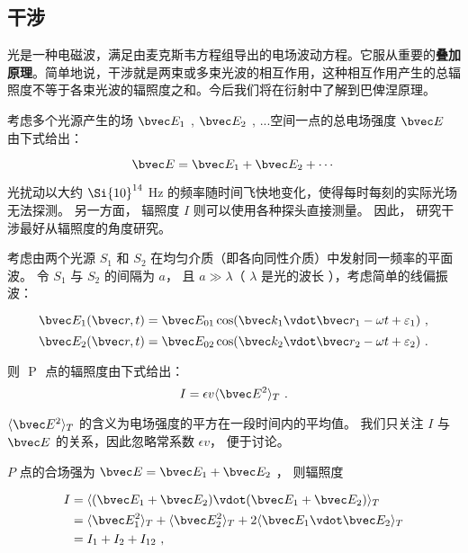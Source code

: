 
\subsection{干涉}

光是一种电磁波，满足由麦克斯韦方程组导出的电场波动方程。它服从重要的\textbf{叠加原理}。简单地说，干涉就是两束或多束光波的相互作用，这种相互作用产生的总辐照度不等于各束光波的辐照度之和。今后我们将在衍射中了解到巴俾涅原理。

考虑多个光源产生的场 $\bvec E_1$ , $\bvec E_2$ , ...空间一点的总电场强度 $\bvec E$ 由下式给出：

\begin{equation}
\bvec E = \bvec E_1 + \bvec E_2 + \cdots
\end{equation}

光扰动以大约 $\Si{10}^{14}$ Hz 的频率随时间飞快地变化，使得每时每刻的实际光场无法探测。 另一方面， 辐照度 $I$ 则可以使用各种探头直接测量。 因此， 研究干涉最好从辐照度的角度研究。

考虑由两个光源 $S_1$ 和 $S_2$ 在均匀介质（即各向同性介质）中发射同一频率的平面波。 令 $S_1$ 与 $S_2$ 的间隔为 $a$， 且 $ a \gg \lambda $（ $\lambda$ 是光的波长 ），考虑简单的线偏振波：

$$ \bvec E_1 ( \bvec r , t) = \bvec E_{01} \cos (\bvec k_1 \vdot \bvec r_1 - \omega t + \varepsilon_1 )~,$$
$$ \bvec E_2 ( \bvec r , t) = \bvec E_{02} \cos (\bvec k_2 \vdot \bvec r_2 - \omega t + \varepsilon_2 )~.$$

则 $ $ P $ $ 点的辐照度由下式给出：
\begin{equation}
 I = \epsilon v \langle \bvec E^2 \rangle _T ~.
\end{equation}

$\langle \bvec E^2 \rangle _T$ 的含义为电场强度的平方在一段时间内的平均值。 我们只关注 $ I $ 与 $ \bvec E $ 的关系，因此忽略常系数 $ \epsilon v$， 便于讨论。 

 $ P $ 点的合场强为 $ \bvec E = \bvec E_1 + \bvec E_2 $ ， 则辐照度

\begin{equation}   
\begin{aligned}
I &= \langle( \bvec E_1 + \bvec E_2)\vdot( \bvec E_1 + \bvec E_2 )\rangle _T \\
&= \langle \bvec E_1^2 \rangle _T + \langle \bvec E_2^2 \rangle _T + 2\langle \bvec E_1 \vdot \bvec E_2 \rangle _T \\
&= I_1 + I_2 + I_{12}~,
\end{aligned}
\end{equation}


